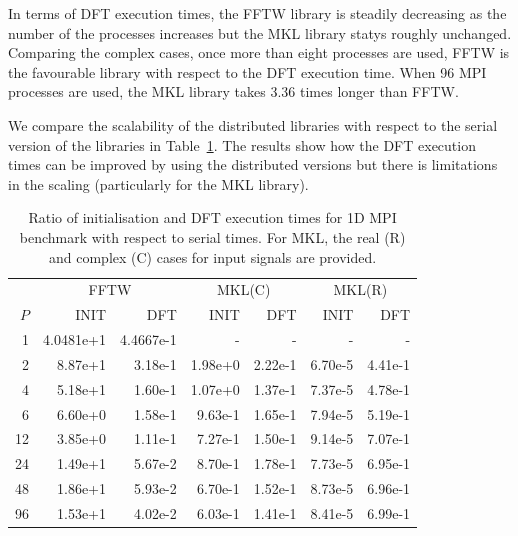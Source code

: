 \documentclass[12pt, a4paper]{article} \setlength{\textheight}{24cm}
\begin{document}
In terms of DFT execution times, the FFTW library is steadily decreasing as the number of the processes increases but the MKL library statys roughly unchanged. Comparing the complex cases, once more than eight processes are used, FFTW is the favourable library with respect to the DFT execution time. When 96 MPI processes are used, the MKL library takes 3.36 times longer than FFTW.

We compare the scalability of the distributed libraries with respect to the serial version of the libraries in Table~\ref{Tbl:MPI}. The results show how the DFT execution times can be improved by using the distributed versions but there is limitations in the scaling (particularly for the MKL library). 

\begin{table}[H]
  \captionsetup{width=0.8\linewidth}
  \centering
  \begin{tabular}{|r|rrr|rrr|}
    \hline
    & \multicolumn{2}{|c|}{FFTW} & \multicolumn{2}{|c|}{MKL(C)} &   \multicolumn{2}{|c|}{MKL(R)}   \\
   $P$ & INIT & DFT & INIT & DFT & INIT & DFT  \\
    \hline
     1 &   4.0481e+1 &   4.4667e-1 &          - &         - &         - &         - \\
   2 &   8.87e+1 &   3.18e-1 &   1.98e+0 &   2.22e-1 &   6.70e-5 &   4.41e-1 \\
   4 &   5.18e+1 &   1.60e-1 &   1.07e+0 &   1.37e-1 &   7.37e-5 &   4.78e-1 \\
   6 &   6.60e+0 &   1.58e-1 &   9.63e-1 &   1.65e-1 &   7.94e-5 &   5.19e-1 \\
   12 &  3.85e+0 &   1.11e-1 &   7.27e-1 &   1.50e-1 &   9.14e-5 &   7.07e-1 \\
   24 &  1.49e+1 &   5.67e-2 &   8.70e-1 &   1.78e-1 &   7.73e-5 &   6.95e-1 \\
   48 &  1.86e+1 &   5.93e-2 &   6.70e-1 &   1.52e-1 &   8.73e-5 &   6.96e-1 \\
   96 &  1.53e+1 &   4.02e-2 &   6.03e-1 &   1.41e-1 &   8.41e-5 &   6.99e-1 \\
    \hline
  \end{tabular}
  \caption{Ratio of initialisation and DFT execution times for 1D MPI benchmark with respect to serial times. For MKL, the real (R) and complex (C) cases for input signals are provided.}\label{Tbl:MPI}
\end{table}
\end{document}
